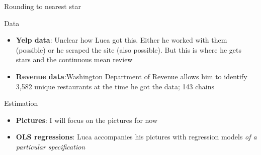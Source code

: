 \documentclass{beamer}
\begin{document}
\begin{frame}{Rounding to nearest star}
	
	\begin{figure}
	\end{figure}

	
	
\end{frame}



\begin{frame}{Data}

\begin{itemize}
\item \textbf{Yelp data}: Unclear how Luca got this.  Either he worked with them (possible) or he scraped the site (also possible). But this is where he gets stars and the continuous mean review
\item \textbf{Revenue data}:Washington Department of Revenue allows him to identify 3,582 unique restaurants at the time he got the data; 143 chains
\end{itemize}

\end{frame}

\begin{frame}{Estimation}

\begin{itemize}
\item \textbf{Pictures}:  I will focus on the pictures for now
\item \textbf{OLS regressions}: Luca accompanies his pictures with regression models \emph{of a particular specification}
\end{itemize}

\end{frame} 
\end{document}
